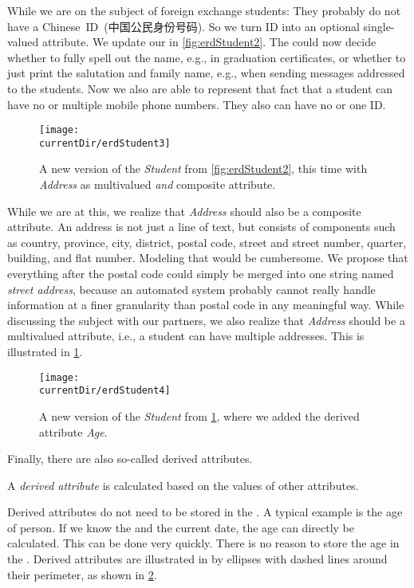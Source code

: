 While we are on the subject of foreign exchange students:
They probably do not have a Chinese~ID~(中国公民身份号码\cite{GB116431999CIN}).
So we turn ID into an optional single-valued attribute.
We update our  in \cref{fig:erdStudent2}.
The  could now decide whether to fully spell out the name, e.g., in graduation certificates, or whether to just print the salutation and family name, e.g., when sending messages addressed to the students.
Now we also are able to represent that fact that a student can have no or multiple mobile phone numbers.
They also can have no or one ID.

\begin{figure}%
\centering%
\texttt{[image: \\currentDir/erdStudent3]}%
\caption{A new version of the \emph{Student}  from \cref{fig:erdStudent2}, this time with \emph{Address} as multivalued \emph{and} composite attribute.}%
\label{fig:erdStudent3}%
\end{figure}%
%
While we are at this, we realize that \emph{Address} should also be a composite attribute.
An address is not just a line of text, but consists of components such as country, province, city, district, postal code, street and street number, quarter, building, and flat number.
Modeling that would be cumbersome.
We propose that everything after the postal code could simply be merged into one string named \emph{street address}, because an automated system probably cannot really handle information at a finer granularity than postal code in any meaningful way.
While discussing the subject with our partners, we also realize that \emph{Address} should be a multivalued attribute, i.e., a student can have multiple addresses.
This is illustrated in \cref{fig:erdStudent3}.

\begin{figure}%
\centering%
\texttt{[image: \\currentDir/erdStudent4]}%
\caption{A new version of the \emph{Student}  from \cref{fig:erdStudent3}, where we added the derived attribute \emph{Age}.}%
\label{fig:erdStudent4}%
\end{figure}%
%
Finally, there are also so-called derived attributes.%
%
\begin{definition}%
\label{def:derivedAttribute}%
A \emph{derived attribute} is calculated based on the values of other attributes.%
\end{definition}%
%
Derived attributes do not need to be stored in the \db.
A typical example is the age of person.
If we know the  and the current date, the age can directly be calculated.
This can be done very quickly.
There is no reason to store the age in the \db.
Derived attributes are illustrated in  by ellipses with dashed lines around their perimeter, as shown in \cref{fig:erdStudent4}.

